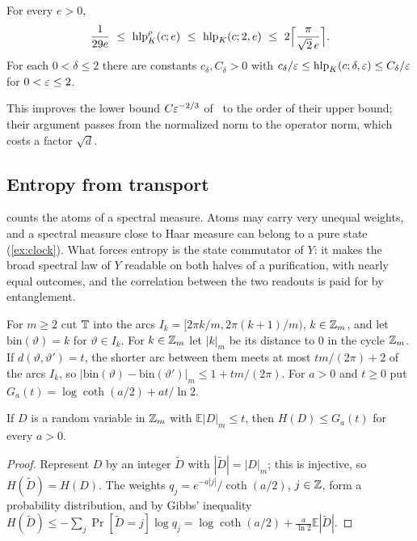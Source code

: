 \begin{corollary}\label{cor:K-profile}
For every $e>0$,
\[
\frac1{29e}\ \le\ \hlp^\rho_K(c;e)\ \le\ \hlp_K(c;2,e)\ \le\ 2\Bigl\lceil\frac{\pi}{\sqrt2\,e}\Bigr\rceil .
\]
For each $0<\delta\le2$ there are constants $c_\delta,C_\delta>0$ with $c_\delta/\varepsilon\le\operatorname{hlp}_K(c;\delta,\varepsilon)\le C_\delta/\varepsilon$
for $0<\varepsilon\le2$.
\end{corollary}

This improves the lower bound $C\varepsilon^{-2/3}$ of~\cite[Lemma~3.5 and Proposition~3.2]{SV18} to the order of their upper bound;
their argument passes from the normalized norm to the operator norm, which costs a factor $\sqrt d$.

\subsection{Entropy from transport}\label{sec:transport-entropy}

 counts the atoms of a spectral measure. Atoms may carry very unequal weights, and a spectral measure close
to Haar measure can belong to a pure state (\cref{ex:clock}). What forces entropy is the state commutator of $Y$: it
makes the broad spectral law of $Y$ readable on both halves of a purification, with nearly equal outcomes, and the
correlation between the two readouts is paid for by entanglement.

For $m\ge2$ cut $\mathbb T$ into the arcs $I_k=[2\pi k/m,2\pi(k+1)/m)$, $k\in\mathbb Z_m$, and let $\mathrm{bin}(\vartheta)=k$ for
$\vartheta\in I_k$. For $k\in\mathbb Z_m$ let $|k|_m$ be its distance to $0$ in the cycle $\mathbb Z_m$. If $d(\vartheta,\vartheta')=t$, the
shorter arc between them meets at most $tm/(2\pi)+2$ of the arcs $I_k$, so
$|\mathrm{bin}(\vartheta)-\mathrm{bin}(\vartheta')|_m\le1+tm/(2\pi)$. For $a>0$ and $t\ge0$ put
$G_a(t)=\log\coth(a/2)+at/\ln2$.

\begin{lemma}\label{lem:gibbs}
If $D$ is a random variable in $\mathbb Z_m$ with $\mathbb E|D|_m\le t$, then $H(D)\le G_a(t)$ for every $a>0$.
\end{lemma}

\begin{proof}
Represent $D$ by an integer $\tilde D$ with $|\tilde D|=|D|_m$; this is injective, so $H(\tilde D)=H(D)$. The weights
$q_j=e^{-a|j|}/\coth(a/2)$, $j\in\mathbb Z$, form a probability distribution, and by Gibbs' inequality
$H(\tilde D)\le-\sum_j\Pr[\tilde D=j]\log q_j=\log\coth(a/2)+\frac a{\ln2}\mathbb E|\tilde D|$.
\end{proof}

